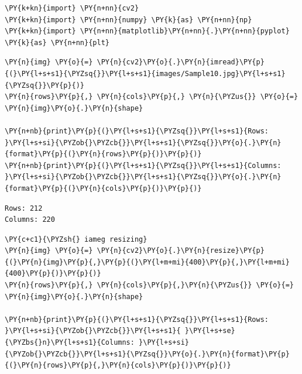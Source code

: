 \vspace{0.5cm}

\begin{tcolorbox}[breakable, size=fbox, boxrule=1pt, pad at break*=1mm,colback=cellbackground, colframe=cellborder]
	\begin{Verbatim}[commandchars=\\\{\}]
\PY{k+kn}{import} \PY{n+nn}{cv2}
\PY{k+kn}{import} \PY{n+nn}{numpy} \PY{k}{as} \PY{n+nn}{np}
\PY{k+kn}{import} \PY{n+nn}{matplotlib}\PY{n+nn}{.}\PY{n+nn}{pyplot} \PY{k}{as} \PY{n+nn}{plt}
	\end{Verbatim}
\end{tcolorbox}

\begin{tcolorbox}[breakable, size=fbox, boxrule=1pt, pad at break*=1mm,colback=cellbackground, colframe=cellborder]
	\begin{Verbatim}[commandchars=\\\{\}]
\PY{n}{img} \PY{o}{=} \PY{n}{cv2}\PY{o}{.}\PY{n}{imread}\PY{p}{(}\PY{l+s+s1}{\PYZsq{}}\PY{l+s+s1}{images/Sample10.jpg}\PY{l+s+s1}{\PYZsq{}}\PY{p}{)}
\PY{n}{rows}\PY{p}{,} \PY{n}{cols}\PY{p}{,} \PY{n}{\PYZus{}} \PY{o}{=} \PY{n}{img}\PY{o}{.}\PY{n}{shape}

\PY{n+nb}{print}\PY{p}{(}\PY{l+s+s1}{\PYZsq{}}\PY{l+s+s1}{Rows: }\PY{l+s+si}{\PYZob{}\PYZcb{}}\PY{l+s+s1}{\PYZsq{}}\PY{o}{.}\PY{n}{format}\PY{p}{(}\PY{n}{rows}\PY{p}{)}\PY{p}{)}
\PY{n+nb}{print}\PY{p}{(}\PY{l+s+s1}{\PYZsq{}}\PY{l+s+s1}{Columns: }\PY{l+s+si}{\PYZob{}\PYZcb{}}\PY{l+s+s1}{\PYZsq{}}\PY{o}{.}\PY{n}{format}\PY{p}{(}\PY{n}{cols}\PY{p}{)}\PY{p}{)}
	\end{Verbatim}
\end{tcolorbox}

\begin{Verbatim}[commandchars=\\\{\}]
Rows: 212
Columns: 220
\end{Verbatim}

\begin{tcolorbox}[breakable, size=fbox, boxrule=1pt, pad at break*=1mm,colback=cellbackground, colframe=cellborder]
	\begin{Verbatim}[commandchars=\\\{\}]
\PY{c+c1}{\PYZsh{} iameg resizing}
\PY{n}{img} \PY{o}{=} \PY{n}{cv2}\PY{o}{.}\PY{n}{resize}\PY{p}{(}\PY{n}{img}\PY{p}{,}\PY{p}{(}\PY{l+m+mi}{400}\PY{p}{,}\PY{l+m+mi}{400}\PY{p}{)}\PY{p}{)}
\PY{n}{rows}\PY{p}{,} \PY{n}{cols}\PY{p}{,}\PY{n}{\PYZus{}} \PY{o}{=} \PY{n}{img}\PY{o}{.}\PY{n}{shape}

\PY{n+nb}{print}\PY{p}{(}\PY{l+s+s1}{\PYZsq{}}\PY{l+s+s1}{Rows: }\PY{l+s+si}{\PYZob{}\PYZcb{}}\PY{l+s+s1}{ }\PY{l+s+se}{\PYZbs{}n}\PY{l+s+s1}{Columns: }\PY{l+s+si}{\PYZob{}\PYZcb{}}\PY{l+s+s1}{\PYZsq{}}\PY{o}{.}\PY{n}{format}\PY{p}{(}\PY{n}{rows}\PY{p}{,}\PY{n}{cols}\PY{p}{)}\PY{p}{)}
	\end{Verbatim}
\end{tcolorbox}

